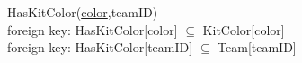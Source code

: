 {\color{ForestGreen}HasKitColor(\underline{color},teamID)}\\
{\color{Orange}\hspace{2mm} foreign key: {\color{Magenta}HasKitColor[color] $\subseteq$ KitColor[color]}} \\
{\color{Orange}\hspace{2mm} foreign key: {\color{Magenta}HasKitColor[teamID] $\subseteq$ Team[teamID]}} \\






\vspace{12px}

